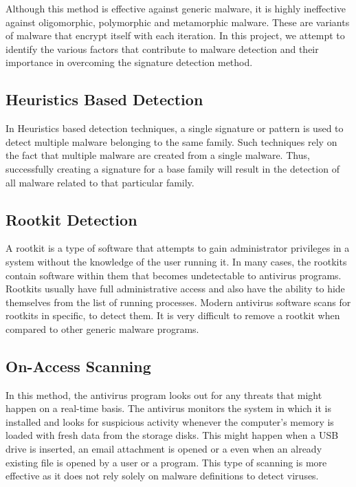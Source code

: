 	Although this method is effective against generic malware, it is highly ineffective against oligomorphic, polymorphic and metamorphic malware. These are variants of malware that encrypt itself with each iteration. In this project, we attempt to identify the various factors that contribute to malware detection and their importance in overcoming the signature detection method.

\subsection{Heuristics Based Detection}
	In Heuristics based detection techniques, a single signature or pattern is used to detect multiple malware belonging to the same family. Such techniques rely on the fact that multiple malware are created from a single malware. Thus, successfully creating a signature for a base family will result in the detection of all malware related to that particular family.
\subsection{Rootkit Detection}
	A rootkit is a type of software that attempts to gain administrator privileges in a system without the knowledge of the user running it. In many cases, the rootkits contain software within them that becomes undetectable to antivirus programs. Rootkits usually have full administrative access and also have the ability to hide themselves from the list of running processes. Modern antivirus software scans for rootkits in specific, to detect them. It is very difficult to remove a rootkit when compared to other generic malware programs.
\subsection{On-Access Scanning}
	In this method, the antivirus program looks out for any threats that might happen on a real-time basis. The antivirus monitors the system in which it is installed and looks for suspicious activity whenever the computer's memory is loaded with fresh data from the storage disks. This might happen when a USB drive is inserted, an email attachment is opened or a even when an already existing file is opened by a user or a program.
	This type of scanning is more effective as it does not rely solely on malware definitions to detect viruses.